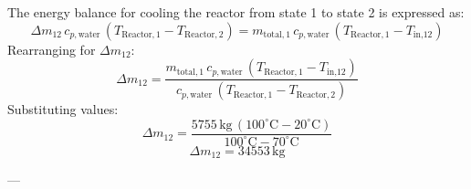 The energy balance for cooling the reactor from state 1 to state 2 is expressed as:  
\[
\Delta m_{12} \, c_{p,\text{water}} \, (T_{\text{Reactor},1} - T_{\text{Reactor},2}) = m_{\text{total},1} \, c_{p,\text{water}} \, (T_{\text{Reactor},1} - T_{\text{in,12}})
\]  
Rearranging for \( \Delta m_{12} \):  
\[
\Delta m_{12} = \frac{m_{\text{total},1} \, c_{p,\text{water}} \, (T_{\text{Reactor},1} - T_{\text{in,12}})}{c_{p,\text{water}} \, (T_{\text{Reactor},1} - T_{\text{Reactor},2})}
\]  
Substituting values:  
\[
\Delta m_{12} = \frac{5755 \, \text{kg} \, (100^\circ\text{C} - 20^\circ\text{C})}{100^\circ\text{C} - 70^\circ\text{C}}
\]  
\[
\Delta m_{12} = 34553 \, \text{kg}
\]  

---